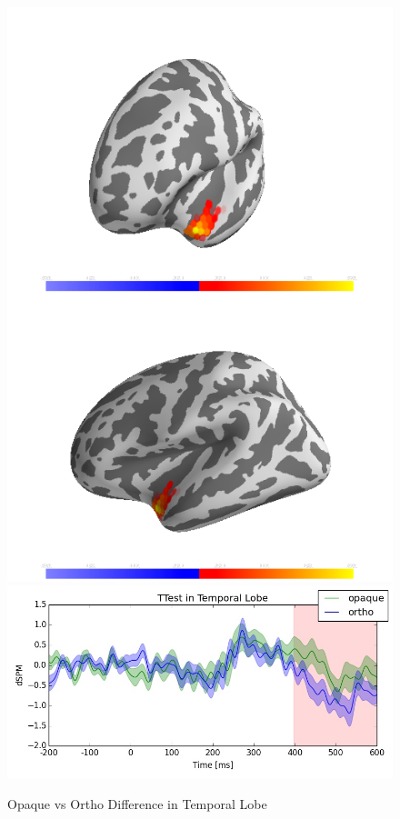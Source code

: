 \documentclass{frontiersSCNS}
\begin{document}
\begin{figure}
\begin{centering}
\includegraphics[scale=0.33]{images/opaque_prime_brain_analysis}\includegraphics[scale=0.33]{images/opaque_prime_analysis}
\par\end{centering}
\caption{\label{fig:opaque_primes} Opaque vs Ortho Difference in Temporal Lobe}
\end{figure}
\end{document}
